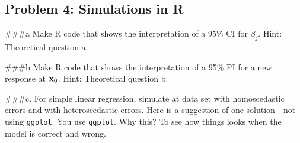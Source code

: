\documentclass[]{article}
\begin{document}
\hypertarget{problem-4-simulations-in-r}{%
\subsection{Problem 4: Simulations in
R}\label{problem-4-simulations-in-r}}

\#\#\#a Make R code that shows the interpretation of a 95\% CI for
\(\beta_j\). Hint: Theoretical question a.

\#\#\#b Make R code that shows the interpretation of a 95\% PI for a new
response at \({\bf x}_0\). Hint: Theoretical question b.

\#\#\#c. For simple linear regression, simulate at data set with
homoscedastic errors and with heteroscedastic errors. Here is a
suggestion of one solution - not using \texttt{ggplot}. You use
\texttt{ggplot}. Why this? To see how things looks when the model is
correct and wrong.
\end{document}
